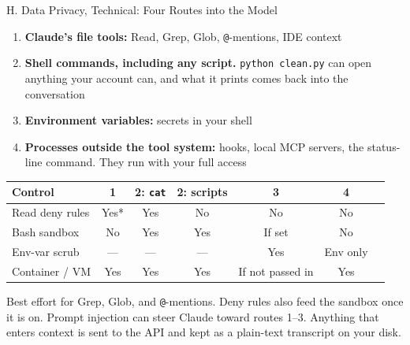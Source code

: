\documentclass[aspectratio=169, 11pt]{beamer}
\begin{document}

\begin{frame}[label=privtech]{H. Data Privacy, Technical: Four Routes into the Model}
  \small
  \begin{enumerate}
    \item \textbf{Claude's file tools:} Read, Grep, Glob, \texttt{@}-mentions, IDE context
    \item \textbf{Shell commands, including any script.} \texttt{python clean.py} can open anything your account can, and what it prints comes back into the conversation
    \item \textbf{Environment variables:} secrets in your shell
    \item \textbf{Processes outside the tool system:} hooks, local MCP servers, the status-line command. They run with your full access
  \end{enumerate}

  \vspace{0.2em}
  \footnotesize
  \renewcommand{\arraystretch}{1.1}
  \begin{tabular}{@{}L{0.30\textwidth}cccccc@{}}
    \toprule
    \textbf{Control} & \textbf{1} & \textbf{2: \texttt{cat}} & \textbf{2: scripts} & \textbf{3} & \textbf{4} \\
    \midrule
    Read deny rules & Yes* & Yes & No & No & No \\
    Bash sandbox & No & Yes & Yes & If set & No \\
    Env-var scrub & --- & --- & --- & Yes & Env only \\
    Container / VM & Yes & Yes & Yes & If not passed in & Yes \\
    \bottomrule
  \end{tabular}

  \vspace{0.1em}
  {\scriptsize *Best effort for Grep, Glob, and \texttt{@}-mentions. Deny rules also feed the sandbox once it is on. Prompt injection can steer Claude toward routes 1--3. Anything that enters context is sent to the API and kept as a plain-text transcript on your disk.}
\end{frame}
\end{document}
